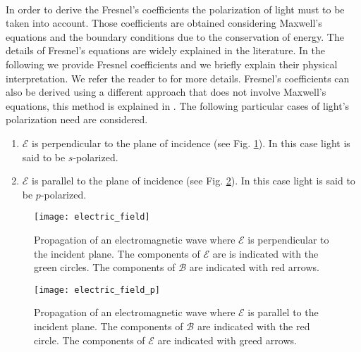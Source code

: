 \\ \indent In order to derive the Fresnel's coefficients the polarization of light must to be taken into account.
Those coefficients are obtained considering Maxwell's equations and the boundary conditions due to the conservation of energy.
The details of Fresnel's equations are widely explained in the literature. 
In the following we provide Fresnel coefficients and we briefly explain their physical interpretation. We refer the reader to \cite{born2013principles, hecht1998hecht} for more details. 
Fresnel's coefficients can also be derived using a different approach that does not involve Maxwell's equations, this method is explained in \cite{feynman2011feynman}.  
The following particular cases of light's polarization need are considered. 
\begin{enumerate}
\item $\boldsymbol{\mathcal{E}}$ is perpendicular to the plane of incidence (see Fig. \ref{fig:electric_field}). In this case light is said to be $s$-polarized.
\item $\boldsymbol{\mathcal{E}}$ is parallel to the plane of incidence (see Fig. \ref{fig:electric_field_p}). In this case light is said to be $p$-polarized.
\end{enumerate}
\begin{figure}[h]
 \label{fig:electric_field}
     \begin{center}
     \texttt{[image: electric\_field]}
     \end{center}
     \caption{Propagation of an electromagnetic wave where $\boldsymbol{\mathcal{E}}$ is perpendicular to the incident plane. The components of $\boldsymbol{\mathcal{E}}$ are is indicated with the green circles.
The components of $\boldsymbol{\mathcal{B}}$ are indicated with red arrows.}
\label{fig:electric_field}
 \end{figure}
\begin{figure}[h]
 \label{fig:electric_field_p}
     \begin{center}
     \texttt{[image: electric\_field\_p]}
     \end{center}
 \caption{Propagation of an electromagnetic wave where $\boldsymbol{\mathcal{E}}$ is parallel to the incident plane. The components of $\boldsymbol{\mathcal{B}}$ are indicated with the red circle.
The components of $\boldsymbol{\mathcal{E}}$ are indicated with greed arrows.}
\label{fig:electric_field_p}
 \end{figure}
